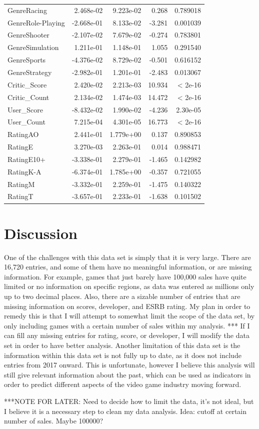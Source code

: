 \documentclass[12pt]{article}
\begin{document}
\begin{table}[ht]
\begin{tabular}{lrrrr}
$$GenreRacing & 2.468e-02 & 9.223e-02 & 0.268 & 0.789018 \\
GenreRole-Playing & -2.668e-01 & 8.133e-02 & -3.281 & 0.001039 \\
GenreShooter & -2.107e-02 & 7.679e-02 & -0.274 & 0.783801 \\
GenreSimulation & 1.211e-01 & 1.148e-01 & 1.055 & 0.291540 \\
GenreSports & -4.376e-02 & 8.729e-02 & -0.501 & 0.616152 \\
GenreStrategy & -2.982e-01 & 1.201e-01 & -2.483 & 0.013067 \\
Critic\_Score & 2.420e-02 & 2.213e-03 & 10.934 & < 2e-16 \\
Critic\_Count & 2.134e-02 & 1.474e-03 & 14.472 & < 2e-16 \\
User\_Score & -8.432e-02 & 1.990e-02 & -4.236 & 2.30e-05 \\
User\_Count & 7.215e-04 & 4.301e-05 & 16.773 & < 2e-16 \\
RatingAO & 2.441e-01 & 1.779e+00 & 0.137 & 0.890853 \\
RatingE & 3.270e-03 & 2.263e-01 & 0.014 & 0.988471 \\
RatingE10+ & -3.338e-01 & 2.279e-01 & -1.465 & 0.142982 \\
RatingK-A & -6.374e-01 & 1.785e+00 & -0.357 & 0.721055 \\
RatingM & -3.332e-01 & 2.259e-01 & -1.475 & 0.140322 \\
RatingT & -3.657e-01 & 2.233e-01 & -1.638 & 0.101502 \\
 \hline
\end{tabular}
\end{table}

\section{Discussion}
\label{sec:disc}

One of the challenges with this data set is simply that it is very large. There are 16,720 entries, and some of them have no meaningful 
information, or are missing information. For example, games that just barely have 100,000 sales have quite limited or no information on 
specific regions, as data was entered as millions only up to two decimal places. Also, there are a sizable number of entries that are 
missing information on scores, developer, and ESRB rating. My plan in order to remedy this is that I will attempt to somewhat limit the 
scope of the data set, by only including games with a certain number of sales within my analysis. ***
If I can fill any missing entries for rating, score, or developer, I will modify the data set in order to have better analysis. Another 
limitation of this data set is the information within this data set is not fully up to date, as it does not include entries from 2017 
onward. This is unfortunate, however I believe this analysis will still give relevant information about the past, which can be used as 
indicators in order to predict different aspects of the video game industry moving forward.

***NOTE FOR LATER: Need to decide how to limit the data, it's not ideal, but I believe it is a necessary step to clean my data analysis. Idea: cutoff at certain number of sales. Maybe 100000?


\end{document}
